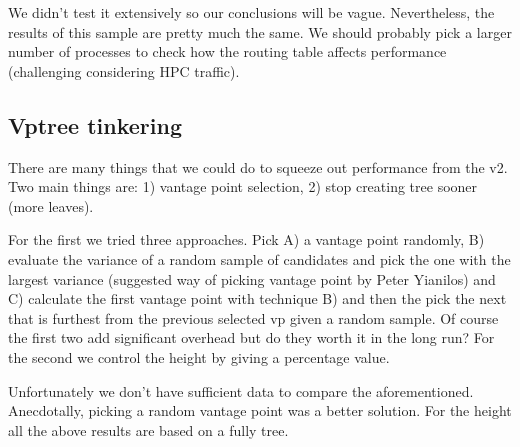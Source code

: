 \documentclass[12pt, a4paper]{article}
\begin{document}
We didn't test it extensively so our conclusions will be vague. Nevertheless, the results of this sample are pretty much the same. We should probably pick a larger number of processes to check how the routing table affects performance (challenging considering HPC traffic).

\subsection{Vptree tinkering}

There are many things that we could do to squeeze out performance from the v2. Two main things are: 1) vantage point selection, 2) stop creating tree sooner (more leaves). 

For the first we tried three approaches. Pick A) a vantage point randomly, B) evaluate the variance of a random sample of candidates and pick the one with the largest variance (suggested way of picking vantage point by Peter Yianilos) and C) calculate the first vantage point with technique B) and then the pick the next that is furthest from the previous selected vp given a random sample. Of course the first two add significant overhead but do they worth it in the long run? For the second we control the height by giving a percentage value. 

Unfortunately we don't have sufficient data to compare the aforementioned. Anecdotally, picking a random vantage point was a better solution. For the height all the above results are based on a fully tree.
\end{document}

